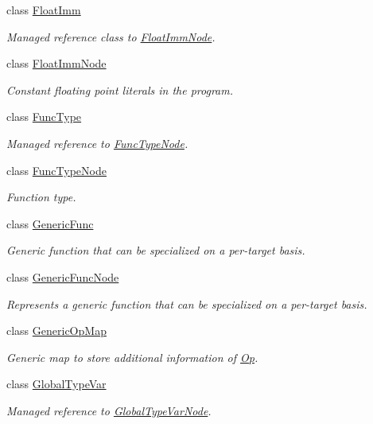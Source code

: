 \begin{DoxyCompactItemize}
class \hyperlink{classtvm_1_1FloatImm}{Float\+Imm}
\begin{DoxyCompactList}\small\item\em Managed reference class to \hyperlink{classtvm_1_1FloatImmNode}{Float\+Imm\+Node}. \end{DoxyCompactList}\item 
class \hyperlink{classtvm_1_1FloatImmNode}{Float\+Imm\+Node}
\begin{DoxyCompactList}\small\item\em Constant floating point literals in the program. \end{DoxyCompactList}\item 
class \hyperlink{classtvm_1_1FuncType}{Func\+Type}
\begin{DoxyCompactList}\small\item\em Managed reference to \hyperlink{classtvm_1_1FuncTypeNode}{Func\+Type\+Node}. \end{DoxyCompactList}\item 
class \hyperlink{classtvm_1_1FuncTypeNode}{Func\+Type\+Node}
\begin{DoxyCompactList}\small\item\em Function type. \end{DoxyCompactList}\item 
class \hyperlink{classtvm_1_1GenericFunc}{Generic\+Func}
\begin{DoxyCompactList}\small\item\em Generic function that can be specialized on a per-\/target basis. \end{DoxyCompactList}\item 
class \hyperlink{classtvm_1_1GenericFuncNode}{Generic\+Func\+Node}
\begin{DoxyCompactList}\small\item\em Represents a generic function that can be specialized on a per-\/target basis. \end{DoxyCompactList}\item 
class \hyperlink{classtvm_1_1GenericOpMap}{Generic\+Op\+Map}
\begin{DoxyCompactList}\small\item\em Generic map to store additional information of \hyperlink{classtvm_1_1Op}{Op}. \end{DoxyCompactList}\item 
class \hyperlink{classtvm_1_1GlobalTypeVar}{Global\+Type\+Var}
\begin{DoxyCompactList}\small\item\em Managed reference to \hyperlink{classtvm_1_1GlobalTypeVarNode}{Global\+Type\+Var\+Node}. \end{DoxyCompactList}\item 

\end{DoxyCompactItemize}
